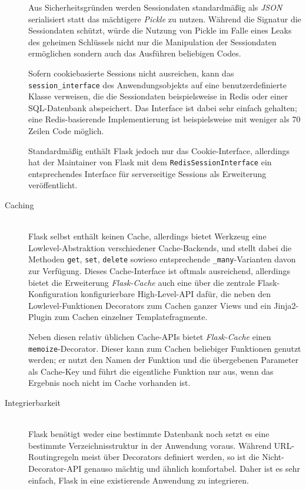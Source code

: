 \begin{description}
Aus Sicherheitsgründen werden Sessiondaten standardmäßig als \emph{JSON} serialisiert statt das
mächtigere \emph{Pickle} zu nutzen. Während die Signatur die Sessiondaten schützt, würde die Nutzung
von Pickle im Falle eines Leaks des geheimen Schlüssels nicht nur die Manipulation der Sessiondaten
ermöglichen sondern auch das Ausführen beliebigen Codes.

Sofern cookiebasierte Sessions nicht ausreichen, kann das \lstinline{session_interface} des
Anwendungsobjekts auf eine benutzerdefinierte Klasse verweisen, die die Sessiondaten beispielsweise
in Redis oder einer SQL-Datenbank abspeichert. Das Interface ist dabei sehr einfach gehalten; eine
Redis-basierende Implementierung ist beispielsweise mit weniger als 70 Zeilen Code möglich.

Standardmäßig enthält Flask jedoch nur das Cookie-Interface, allerdings hat der Maintainer von Flask
mit dem \lstinline{RedisSessionInterface} ein entsprechendes Interface für serverseitige Sessions
als Erweiterung veröffentlicht.


\item[Caching] \hfill \\
Flask selbst enthält keinen Cache, allerdings bietet Werkzeug eine Lowlevel-Abstraktion
verschiedener Cache-Backends, und stellt dabei die Methoden \lstinline{get}, \lstinline{set},
\lstinline{delete} sowieso entsprechende \lstinline{_many}-Varianten davon zur Verfügung. Dieses
Cache-Interface ist oftmals ausreichend, allerdings bietet die Erweiterung \emph{Flask-Cache} auch
eine über die zentrale Flask-Konfiguration konfigurierbare High-Level-API dafür, die neben den
Lowlevel-Funktionen Decorators zum Cachen ganzer Views und ein Jinja2-Plugin zum Cachen einzelner
Templatefragmente.

Neben diesen relativ üblichen Cache-APIs bietet \emph{Flask-Cache} einen
\lstinline{memoize}-Decorator. Dieser kann zum Cachen beliebiger Funktionen genutzt werden; er nutzt
den Namen der Funktion und die übergebenen Parameter als Cache-Key und führt die eigentliche
Funktion nur aus, wenn das Ergebnis noch nicht im Cache vorhanden ist.


\item[Integrierbarkeit] \hfill \\
Flask benötigt weder eine bestimmte Datenbank noch setzt es eine bestimmte Verzeichnisstruktur in
der Anwendung voraus. Während URL-Routingregeln meist über Decorators definiert werden, so ist die
Nicht-Decorator-API genauso mächtig und ähnlich komfortabel. Daher ist es sehr einfach, Flask in
eine existierende Anwendung zu integrieren.


\end{description}
